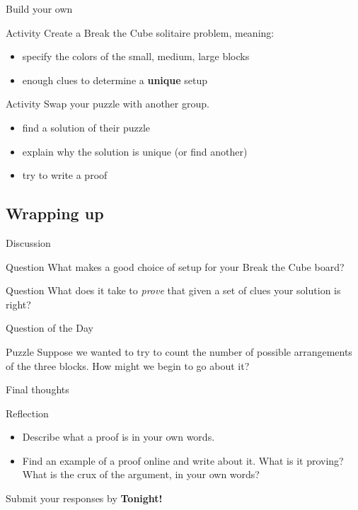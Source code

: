 \documentclass{beamer}
\begin{document}
\begin{frame}{Build your own}
  \begin{block}{Activity}
    Create a Break the Cube solitaire problem, meaning:
    \begin{itemize}
      \item specify the colors of the small, medium, large blocks
      \item enough clues to determine a \textbf{unique} setup
    \end{itemize}
  \end{block}
  \pause
  \begin{block}{Activity}
    Swap your puzzle with another group.
    \begin{itemize}
      \item find a solution of their puzzle
      \item explain why the solution is unique (or find another)
      \item try to write a proof
    \end{itemize}
  \end{block}
\end{frame}

\subsection{Wrapping up}

\begin{frame}{Discussion}
\pause
  \begin{block}{Question}
    What makes a good choice of setup for your Break the Cube board?
  \end{block}
\pause
  \begin{block}{Question}
    What does it take to \emph{prove} that given a set of clues your solution is right?
  \end{block}
\end{frame}


\begin{frame}{Question of the Day}
\pause
  \begin{block}{Puzzle}
    Suppose we wanted to try to count the number of possible arrangements of the three blocks.  How might we begin to go about it?
  \end{block}
\end{frame}

\begin{frame}{Final thoughts}
  \begin{block}{Reflection}
    \begin{itemize}
\pause
      \item Describe what a proof is in your own words.
\pause
      \item Find an example of a proof online and write about it.  What is it proving?  What is the crux of the argument, in your own words?
    \end{itemize}
  \end{block}
\begin{center}
Submit your responses by \textbf{Tonight!}
\end{center}
\end{frame}
\end{document}
